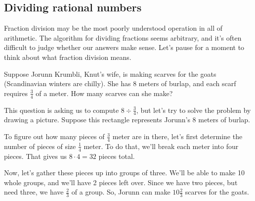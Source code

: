 \subsection{Dividing rational numbers}

Fraction division may be the most poorly understood operation in all of arithmetic. The algorithm for dividing fractions seems arbitrary, and it's often difficult to judge whether our answers make sense. Let's pause for a moment to think about what fraction division means.

Suppose Jorunn Krumbli, Knut's wife, is making scarves for the goats (Scandinavian winters are chilly). She has 8 meters of burlap, and each scarf requires $\frac{3}{4}$ of a meter. How many scarves can she make?

This question is asking us to compute $8 \div \frac{3}{4}$, but let's try to solve the problem by drawing a picture. Suppose this rectangle represents Jorunn's 8 meters of burlap.
\begin{center}
\end{center}

To figure out how many pieces of $\frac{3}{4}$ meter are in there, let's first determine the number of pieces of size $\frac{1}{4}$ meter. To do that, we'll break each meter into four pieces. That gives us $8 \cdot 4 = 32$ pieces total.
\begin{center}
\end{center}

Now, let's gather these pieces up into groups of three. We'll be able to make 10 whole groups, and we'll have 2 pieces left over. Since we have two pieces, but need three, we have $\frac{2}{3}$ of a group. So, Jorunn can make $10\frac{2}{3}$ scarves for the goats.
\begin{center}
\end{center}

